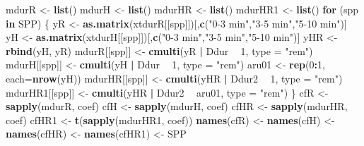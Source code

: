 \documentclass[12pt,]{book}
\newenvironment{Shaded}{\begin{snugshade}}{\end{snugshade}}
\newcommand{\ControlFlowTok}[1]{\textcolor[rgb]{0.13,0.29,0.53}{\textbf{#1}}}
\newcommand{\DataTypeTok}[1]{\textcolor[rgb]{0.13,0.29,0.53}{#1}}
\newcommand{\DecValTok}[1]{\textcolor[rgb]{0.00,0.00,0.81}{#1}}
\newcommand{\KeywordTok}[1]{\textcolor[rgb]{0.13,0.29,0.53}{\textbf{#1}}}
\newcommand{\NormalTok}[1]{#1}
\newcommand{\OperatorTok}[1]{\textcolor[rgb]{0.81,0.36,0.00}{\textbf{#1}}}
\newcommand{\StringTok}[1]{\textcolor[rgb]{0.31,0.60,0.02}{#1}}
\begin{document}
\begin{Shaded}
\begin{Highlighting}[]
\NormalTok{mdurR <-}\StringTok{ }\KeywordTok{list}\NormalTok{()}
\NormalTok{mdurH <-}\StringTok{ }\KeywordTok{list}\NormalTok{()}
\NormalTok{mdurHR <-}\StringTok{ }\KeywordTok{list}\NormalTok{()}
\NormalTok{mdurHR1 <-}\StringTok{ }\KeywordTok{list}\NormalTok{()}
\ControlFlowTok{for}\NormalTok{ (spp }\ControlFlowTok{in}\NormalTok{ SPP) \{}
\NormalTok{    yR <-}\StringTok{ }\KeywordTok{as.matrix}\NormalTok{(xtdurR[[spp]])[,}\KeywordTok{c}\NormalTok{(}\StringTok{"0-3 min"}\NormalTok{,}\StringTok{"3-5 min"}\NormalTok{,}\StringTok{"5-10 min"}\NormalTok{)]}
\NormalTok{    yH <-}\StringTok{ }\KeywordTok{as.matrix}\NormalTok{(xtdurH[[spp]])[,}\KeywordTok{c}\NormalTok{(}\StringTok{"0-3 min"}\NormalTok{,}\StringTok{"3-5 min"}\NormalTok{,}\StringTok{"5-10 min"}\NormalTok{)]}
\NormalTok{    yHR <-}\StringTok{ }\KeywordTok{rbind}\NormalTok{(yH, yR)}
\NormalTok{    mdurR[[spp]] <-}\StringTok{ }\KeywordTok{cmulti}\NormalTok{(yR }\OperatorTok{|}\StringTok{ }\NormalTok{Ddur }\OperatorTok{~}\StringTok{ }\DecValTok{1}\NormalTok{, }\DataTypeTok{type =} \StringTok{"rem"}\NormalTok{)}
\NormalTok{    mdurH[[spp]] <-}\StringTok{ }\KeywordTok{cmulti}\NormalTok{(yH }\OperatorTok{|}\StringTok{ }\NormalTok{Ddur }\OperatorTok{~}\StringTok{ }\DecValTok{1}\NormalTok{, }\DataTypeTok{type =} \StringTok{"rem"}\NormalTok{)}
\NormalTok{    aru01 <-}\StringTok{ }\KeywordTok{rep}\NormalTok{(}\DecValTok{0}\OperatorTok{:}\DecValTok{1}\NormalTok{, }\DataTypeTok{each=}\KeywordTok{nrow}\NormalTok{(yH))}
\NormalTok{    mdurHR[[spp]] <-}\StringTok{ }\KeywordTok{cmulti}\NormalTok{(yHR }\OperatorTok{|}\StringTok{ }\NormalTok{Ddur2 }\OperatorTok{~}\StringTok{ }\DecValTok{1}\NormalTok{, }\DataTypeTok{type =} \StringTok{"rem"}\NormalTok{)}
\NormalTok{    mdurHR1[[spp]] <-}\StringTok{ }\KeywordTok{cmulti}\NormalTok{(yHR }\OperatorTok{|}\StringTok{ }\NormalTok{Ddur2 }\OperatorTok{~}\StringTok{ }\NormalTok{aru01, }\DataTypeTok{type =} \StringTok{"rem"}\NormalTok{)}
\NormalTok{\}}
\NormalTok{cfR <-}\StringTok{ }\KeywordTok{sapply}\NormalTok{(mdurR, coef)}
\NormalTok{cfH <-}\StringTok{ }\KeywordTok{sapply}\NormalTok{(mdurH, coef)}
\NormalTok{cfHR <-}\StringTok{ }\KeywordTok{sapply}\NormalTok{(mdurHR, coef)}
\NormalTok{cfHR1 <-}\StringTok{ }\KeywordTok{t}\NormalTok{(}\KeywordTok{sapply}\NormalTok{(mdurHR1, coef))}
\KeywordTok{names}\NormalTok{(cfR) <-}\StringTok{ }\KeywordTok{names}\NormalTok{(cfH) <-}\StringTok{ }\KeywordTok{names}\NormalTok{(cfHR) <-}\StringTok{ }\KeywordTok{names}\NormalTok{(cfHR1) <-}\StringTok{ }\NormalTok{SPP}


\end{Highlighting}
\end{Shaded}
\end{document}
